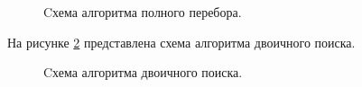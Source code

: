 \documentclass[12pt]{report}
\begin{document}
\begin{figure}[H]
	\caption{Cхема алгоритма полного перебора.}
	\label{fig:Brute}
\end{figure}

\newpage
На рисунке \ref{fig:Binary} представлена схема алгоритма двоичного поиска.

\begin{figure}[H]
	\caption{Cхема алгоритма двоичного поиска.}
	\label{fig:Binary}
\end{figure}
\end{document}
